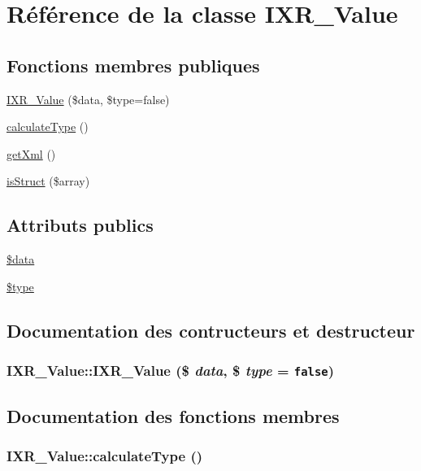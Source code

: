 \hypertarget{classIXR__Value}{
\section{R\'{e}f\'{e}rence de la classe IXR\_\-Value}
\label{classIXR__Value}
}
\subsection*{Fonctions membres publiques}
\begin{CompactItemize}
\item 
\hyperlink{classIXR__Value_a0}{IXR\_\-Value} (\$data, \$type=false)
\item 
\hyperlink{classIXR__Value_a1}{calculate\-Type} ()
\item 
\hyperlink{classIXR__Value_a2}{get\-Xml} ()
\item 
\hyperlink{classIXR__Value_a3}{is\-Struct} (\$array)
\end{CompactItemize}
\subsection*{Attributs publics}
\begin{CompactItemize}
\item 
\hyperlink{classIXR__Value_o0}{\$data}
\item 
\hyperlink{classIXR__Value_o1}{\$type}
\end{CompactItemize}


\subsection{Documentation des contructeurs et destructeur}
\hypertarget{classIXR__Value_a0}{
\subsubsection[IXR\_\-Value]{\setlength{\rightskip}{0pt plus 5cm}IXR\_\-Value::IXR\_\-Value (\$ {\em data}, \$ {\em type} = {\tt false})}}
\label{classIXR__Value_a0}




\subsection{Documentation des fonctions membres}
\hypertarget{classIXR__Value_a1}{
\subsubsection[calculateType]{\setlength{\rightskip}{0pt plus 5cm}IXR\_\-Value::calculate\-Type ()}}
\label{classIXR__Value_a1}


